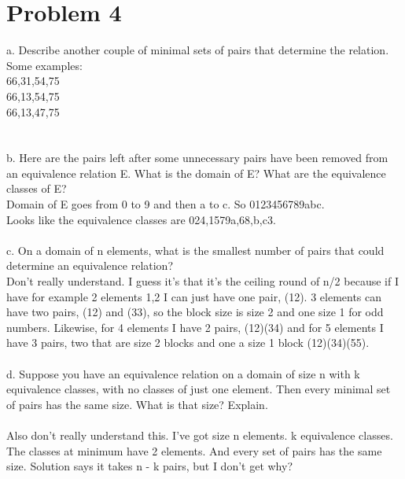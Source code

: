 \documentclass{article}
\begin{document}
\section{Problem 4}
a. Describe another couple of minimal sets of pairs that determine the relation.
\\
Some examples:
\\
{66,31,54,75}\\
{66,13,54,75}\\
{66,13,47,75}\\
\\\\
b. Here are the pairs left after some unnecessary pairs have been removed from an equivalence relation E. What is the domain of E? What are the equivalence classes of E?
\\
Domain of E goes from 0 to 9 and then a to c. So {0123456789abc}.\\ Looks like the equivalence classes are {024},{1579a},{68},{b},{c3}. 
\\\\
c. On a domain of n elements, what is the smallest number of pairs that could determine an equivalence relation?
\\
Don't really understand. I guess it's that it's the ceiling round of n/2 because if I have for example 2 elements {1,2} I can just have one pair, (12). 3 elements can have two pairs, (12) and (33), so the block size is size 2 and one size 1 for odd numbers. Likewise, for 4 elements I have 2 pairs, (12)(34) and for 5 elements I have 3 pairs, two that are size 2 blocks and one a size 1 block (12)(34)(55). 
\\\\
d. Suppose you have an equivalence relation on a domain of size n with k equivalence classes,
with no classes of just one element. Then every minimal set of pairs has the same size. What is
that size? Explain.
\\\\
Also don't really understand this. I've got size n elements. k equivalence classes. The classes at minimum have 2 elements. And every set of pairs has the same size. Solution says it takes n - k pairs, but I don't get why? 
\end{document}
